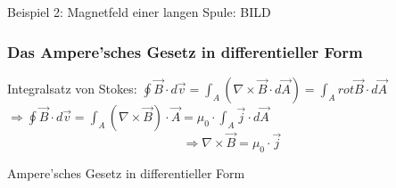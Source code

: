 \noindent Beispiel 2: Magnetfeld einer langen Spule:
BILD

\subsubsection{Das Ampere'sches Gesetz in differentieller Form}
Integralsatz von Stokes: $ {\displaystyle\oint\vec{B} \cdot d\vec{v} = \int_A (\nabla\times\vec{B} \cdot d \vec{A}) = \int_A rot\vec{B} \cdot d\vec{A}} $ \\
$ \Rightarrow {\displaystyle\oint\vec{B} \cdot d\vec{v} = \int_A (\nabla\times\vec{B}) \cdot\vec{A} = \mu_0 \cdot \int_A \vec{j} \cdot d\vec{A}} $
$$ \boxed{\Rightarrow \nabla\times\vec{B} = \mu_0 \cdot \vec{j}} $$
\begin{center}
	Ampere'sches Gesetz in differentieller Form
\end{center}

